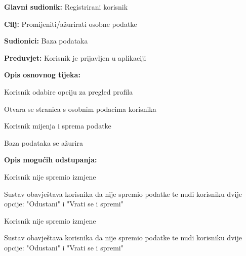 				\noindent {}
					\begin{packed_item}
	
						\item \textbf{Glavni sudionik: }Registrirani korisnik
						\item  \textbf{Cilj:} Promijeniti/ažurirati osobne podatke
						\item  \textbf{Sudionici:} Baza podataka
						\item  \textbf{Preduvjet:} Korisnik je prijavljen u aplikaciji
						\item  \textbf{Opis osnovnog tijeka:}
						
						\item[] \begin{packed_enum}
	
							\item Korisnik odabire opciju za pregled profila
							\item Otvara se stranica s osobnim podacima korisnika
							\item Korisnik mijenja i sprema podatke
							\item Baza podataka se ažurira

						\end{packed_enum}
						
						\item  \textbf{Opis mogućih odstupanja:}
						
						\item[] \begin{packed_item}
	
							\item[3.a] Korisnik nije spremio izmjene
								\begin{packed_item}
									\item Sustav obavještava korisnika da nije spremio podatke te nudi korisniku dvije opcije: "Odustani" i "Vrati se i spremi"
								\end{packed_item}
								
							\item[3.b] Korisnik nije spremio izmjene
								\begin{packed_item}
									\item Sustav obavještava korisnika da nije spremio podatke te nudi korisniku dvije opcije: "Odustani" i "Vrati se i spremi"
								\end{packed_item}
							
						\end{packed_item}						
					\end{packed_item}
					
